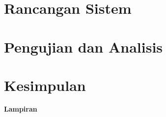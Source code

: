 \documentclass[12pt,a4paper,oneside,reqno]{report}
\begin{document}
		
		
		
		
		
		
		

	\chapter{Rancangan Sistem}
		
		
		

	\chapter{Pengujian dan Analisis}
		
		
		
		
		

	\chapter{Kesimpulan}
		
		

	{}
	
			
	\newpage
	\begin{center}
		{\center \fontsize{16}{1}\huge \bfseries Lampiran}
	\end{center}
		
	
\end{document}
